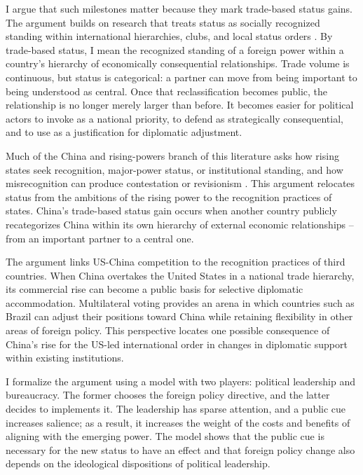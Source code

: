 \documentclass[referee,pdflatex,sn-basic]{sn-jnl}
\theoremstyle{thmstylethree}
\begin{document}
I argue that such milestones matter because they mark trade-based status gains. The argument builds on research that treats status as socially recognized standing within international hierarchies, clubs, and local status orders \citep{paul_larson_wohlforth2014, wolfRespectDisrespect2011, duque_2018, renshon2017, gotz_2021, roren_2024, roren2025_power_recognition, wolfTakingInteractionSeriously2019}. By trade-based status, I mean the recognized standing of a foreign power within a country's hierarchy of economically consequential relationships. Trade volume is continuous, but status is categorical: a partner can move from being important to being understood as central. Once that reclassification becomes public, the relationship is no longer merely larger than before. It becomes easier for political actors to invoke as a national priority, to defend as strategically consequential, and to use as a justification for diplomatic adjustment.

Much of the China and rising-powers branch of this literature asks how rising states seek recognition, major-power status, or institutional standing, and how misrecognition can produce contestation or revisionism \citep{deng2008_status, larson_shevchenko2010_status_seekers, ward2017_status_challenge, murray2018_recognition, mukherjee2022_ascending}. This argument relocates status from the ambitions of the rising power to the recognition practices of states. China's trade-based status gain occurs when another country publicly recategorizes China within its own hierarchy of external economic relationships -- from an important partner to a central one.

The argument links US-China competition to the recognition practices of third countries. When China overtakes the United States in a national trade hierarchy, its commercial rise can become a public basis for selective diplomatic accommodation. Multilateral voting provides an arena in which countries such as Brazil can adjust their positions toward China while retaining flexibility in other areas of foreign policy. This perspective locates one possible consequence of China's rise for the US-led international order in changes in diplomatic support within existing institutions.

I formalize the argument using a model with two players: political leadership and bureaucracy. The former chooses the foreign policy directive, and the latter decides to implements it. The leadership has sparse attention, and a public cue increases salience; as a result, it increases the weight of the costs and benefits of aligning with the emerging power. The model shows that the public cue is necessary for the new status to have an effect and that foreign policy change also depends on the ideological dispositions of political leadership.
\end{document}
